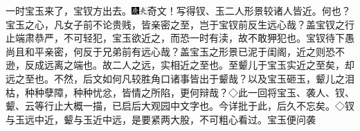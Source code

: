 一时宝玉来了，宝钗方出去。{\includegraphics[width=3mm]{../Images/00004}\includegraphics[width=3mm]{../Images/00012}\footnotesize \kaishu 奇文！写得钗、玉二人形景较诸人皆近。何也？宝玉之心，凡女子前不论贵贱，皆亲密之至，岂于宝钗前反生远心哉？盖宝钗之行止端肃恭严，不可轻犯，宝玉欲近之，而恐一时有渎，故不敢狎犯也。宝钗待下愚尚且和平亲密，何反于兄弟前有远心哉？盖宝玉之形景已泥于闺阁，近之则恐不逊，反成远离之端也。故二人之远，实相近之至也。至颦儿于宝玉实近之至矣，却远之至也。不然，后文如何凡较胜角口诸事皆出于颦哉？以及宝玉砸玉，颦儿之泪枯，种种孽障，种种忧忿，皆情之所陷，更何辩哉？◇此一回将宝玉、袭人、钗、颦、云等行止大概一描，已启后大观园中文字也。今详批于此，后久不忘矣。◇钗与玉远中近，颦与玉近中远，是要紧两大股，不可粗心看过。}宝玉便问袭